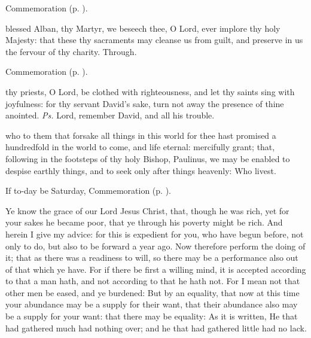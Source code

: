 \begin{rubric}
	Commemoration  (p. \pageref{PaulinusSecret}).
\end{rubric}


\postcommunion
{} blessed Alban, thy Martyr, we beseech thee, O Lord, ever implore thy holy Majesty: that these thy sacraments may cleanse us from guilt, and preserve in us the fervour of thy charity. Through.

\begin{rubric}
	Commemoration  (p. \pageref{PaulinusPostcommunion}).
\end{rubric}


\clearpage
{}

\introit
{} thy priests, O Lord, be clothed with righteousness, and let thy saints sing with joyfulness: for thy servant David's sake, turn not away the presence of thine anointed. \textit{Ps.} Lord, remember David, and all his trouble.

\collect\label{PaulinusCollect}
 who to them that forsake all things in this world for thee hast promised a hundredfold in the world to come, and life eternal: mercifully grant; that, following in the footsteps of thy holy Bishop, Paulinus, we may be enabled to despise earthly things, and to seek only after things heavenly: Who livest.

\begin{rubric}
	If to-day be Saturday, Commemoration  (p. \pageref{JohnBaptistVigilCollect}).
\end{rubric}

 Ye know the grace of our Lord Jesus Christ, that, though he was rich, yet for your sakes he became poor, that ye through his poverty might be rich. And herein I give my advice: for this is expedient for you, who have begun before, not only to do, but also to be forward a year ago. Now therefore perform the doing of it; that as there was a readiness to will, so there may be a performance also out of that which ye have. For if there be first a willing mind, it is accepted according to that a man hath, and not according to that he hath not. For I mean not that other men be eased, and ye burdened: But by an equality, that now at this time your abundance may be a supply for their want, that their abundance also may be a supply for your want: that there may be equality: As it is written, He that had gathered much had nothing over; and he that had gathered little had no lack.

